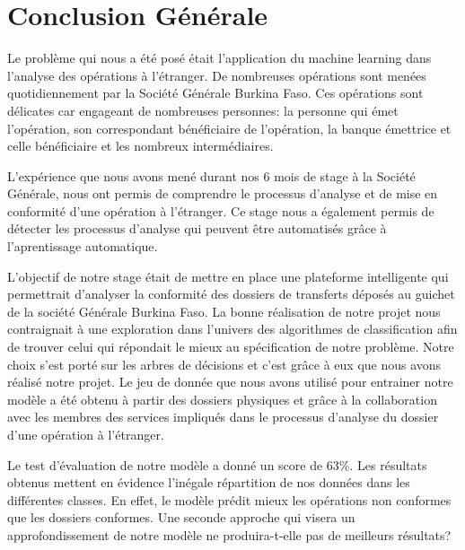 \chapter*{Conclusion Générale}

Le problème qui nous a été posé était l'application du machine learning dans 
l'analyse des opérations à l'étranger. De nombreuses opérations sont menées 
quotidiennement par la Société Générale Burkina Faso. Ces opérations sont 
délicates car engageant de nombreuses personnes: la personne qui émet 
l'opération, son correspondant bénéficiaire de l'opération, la banque émettrice
 et celle bénéficiaire et les nombreux intermédiaires.


L'expérience que nous avons mené durant nos 6 mois de stage à la Société Générale,
nous ont permis de comprendre le processus d'analyse et de mise en conformité 
d'une opération à l'étranger. Ce stage nous a également permis de détecter les
processus d'analyse qui peuvent être automatisés grâce à l'aprentissage 
automatique.


L'objectif de notre stage était de mettre en place une plateforme intelligente qui
permettrait d'analyser la conformité des dossiers de transferts déposés au guichet
de la société Générale Burkina Faso. La bonne réalisation de notre projet nous 
contraignait à une exploration dans l'univers des algorithmes de classification
afin de trouver celui qui répondait le mieux au spécification de notre 
problème. Notre choix s'est porté sur les arbres de décisions et c'est grâce à 
eux que nous avons réalisé notre projet.
Le jeu de donnée que nous avons utilisé pour entrainer notre modèle a été obtenu à
partir des dossiers physiques et grâce à la collaboration avec les membres  
des services impliqués dans le processus d'analyse du dossier d'une opération à
 l'étranger.


Le test d’évaluation de notre modèle a donné un score de 63\%. Les résultats obtenus
 mettent en évidence l’inégale répartition de nos données dans les différentes 
 classes. En effet, le modèle prédit mieux les opérations non conformes que 
 les dossiers conformes. Une seconde approche qui visera un approfondissement de
 notre modèle ne produira-t-elle pas de meilleurs résultats?


